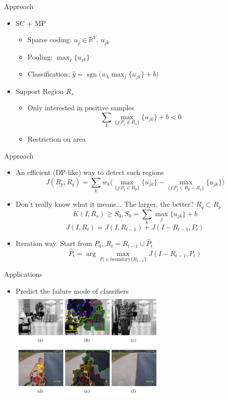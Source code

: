 \documentclass[12pt]{beamer}
\begin{document}
\begin{frame}{Approach}
    \begin{itemize}
        \item SC + MP
        \begin{itemize}
            \item Sparse coding: $u_j \in \mathbb{R}^V$. $u_{jk}$
            \item Pooling: $\max_j \{u_{jk}\}$
            \item Classification: $\hat{y} = \mathop{sgn} \Big( w_k \max_j \{u_{jk}\} + b \Big)$
        \end{itemize}
        \item Support Region $R_s$
        \begin{itemize}
            \item Only interested in positive samples
            \[ \sum_k \max_{\{j|P_j \notin R_s \}} \{ u_{jk} \} + b < 0 \]
            \item Restriction on area
        \end{itemize}
    \end{itemize}
\end{frame}

\begin{frame}{Approach}
    \begin{itemize}
        \item An efficient (DP-like) way to detect such regions
        \[ J(R_p, R_q) = \sum_k w_k \Big( \max_{\{j|P_j\in R_p\}} \{u_{jk}\} - \max_{\{j|P_j\in R_p-R_q\}} \{u_{jk}\} \Big) \]
        \item Don't really know what it means... The larger, the better? $R_q \subset R_p$
        \[ K(I, R_s) \geq S_0, S_0 = \sum_k \max_j \{u_{jk}\} + b \]
        \[ J(I, R_t) = J(I, R_{t - 1}) + J(I - R_{t - 1}, P_t) \]
        \item Iteration way. Start from $P_0$, $R_t = R_{t - 1} \cup \hat{P}_t$
        \[ \hat{P}_t  = \arg \max_{P_t \in \text{boundary}\{R_{t-1}\}} J(I - R_{t - 1}, P_t) \]
    \end{itemize}
\end{frame}

\begin{frame}{Applications}
    \begin{itemize}
        \item Predict the failure mode of classifiers
        \medskip
        \includegraphics[width=0.6\textwidth]{fig2.png} \\
    \end{itemize}
\end{frame}
\end{document}
